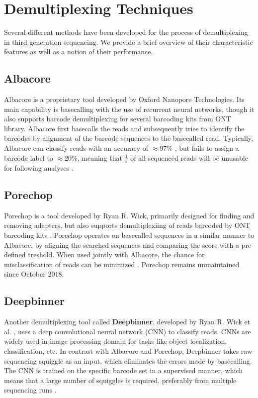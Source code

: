 \section{Demultiplexing Techniques}
Several different methods have been developed for the process of demultiplexing in third generation sequencing. We provide a brief overview of their characteristic features as well as a notion of their performance.

\subsection{Albacore}
Albacore is a proprietary tool developed by Oxford Nanopore Technologies. Its main capability is basecalling with the use of recurrent neural networks, though it also supports barcode demultiplexing for several barcoding kits from ONT library. Albacore first basecalls the reads and subsequently tries to identify the barcodes by alignment of the barcode sequences to the basecalled read. Typically, Albacore can classify reads with an accuracy of $\approx 97\%$ \cite{Deepbinner}, but fails to assign a barcode label to $\approx 20\%$, meaning that $\frac{1}{5}$ of all sequenced reads will be unusable for following analyses \cite{Deepbinner}.

\subsection{Porechop}
Porechop is a tool developed by Ryan R. Wick, primarily designed for finding and removing adapters, but also supports demultiplexiing of reads barcoded by ONT barcoding kits \cite{Porechop}. Porechop operates on basecalled sequences in a similar manner to Albacore, by aligning the searched sequences and comparing the score with a pre-defined treshold. When used jointly with Albacore, the chance for misclassification of reads can be minimized \cite{Porechop}. Porechop remains unmaintained since October $2018$.

\subsection{Deepbinner}
Another demultiplexing tool called \textbf{Deepbinner}, developed by Ryan R. Wick et al. \cite{Deepbinner}, uses a deep convolutional neural network (CNN) to classify reads. CNNs are widely used in image processing domain for tasks like object localization, classification, etc. In contrast with Albacore and Porechop, Deepbinner takes raw sequencing squiggle as an input, which eliminates the errors made by  basecalling. The CNN is trained on the specific barcode set in a supervised manner, which means that a large number of squiggles is required, preferably from multiple sequencing runs \cite{Deepbinner}.

